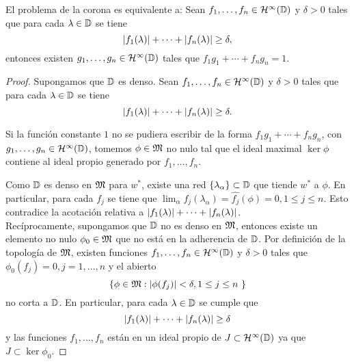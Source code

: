 \begin{theorem}
    El problema de la corona es equivalente a:
     Sean $f_1, \dots, f_n \in \mathcal{H}^{\infty}(\mathbb{D})$ y $\delta > 0$ tales que para cada $\lambda \in \mathbb{D}$ se tiene
\begin{equation*}
    \left\lvert f_1(\lambda)\right\rvert + \cdots + \left\lvert f_n(\lambda)\right\rvert \geq \delta,
\end{equation*}
     entonces existen $g_1, \dots, g_n \in \mathcal{H}^{\infty}(\mathbb{D})$ tales que $f_1 g_1 + \cdots + f_n g_n = 1$.

\end{theorem}

\begin{proof}
Supongamos que $\mathbb{D}$ es denso. Sean $f_1, \dots, f_n \in \mathcal{H}^{\infty}(\mathbb{D})$ y $\delta > 0$ tales que para cada $\lambda \in \mathbb{D}$ se tiene
\begin{equation*}
    \left\lvert f_1(\lambda)\right\rvert + \cdots + \left\lvert f_n(\lambda)\right\rvert \geq \delta.
\end{equation*}

Si la función constante $1$ no se pudiera escribir de la forma $f_1 g_1 + \cdots + f_n g_n$, con $g_1, \dots, g_n \in \mathcal{H}^{\infty}(\mathbb{D})$, tomemos $\phi \in \mathfrak{M}$ no nulo tal que el ideal maximal $\ker \phi$ contiene al ideal propio generado por $f_1, \dots, f_n$.

Como $\mathbb{D}$ es denso en $\mathfrak{M}$ para $w^*$, existe una red $\{ \lambda_\alpha \} \subset \mathbb{D}$ que tiende $w^*$ a $\phi$. En particular, para cada $f_j$ se tiene que $\lim_\alpha f_j (\lambda_\alpha) = \hat{f_j} (\phi) = 0, 1 \leq j \leq n$. Esto contradice la acotación relativa a $\left\lvert f_1(\lambda)\right\rvert + \cdots + \left\lvert f_n(\lambda)\right\rvert$. \\

Recíprocamente, supongamos que $\mathbb{D}$ no es denso en $\mathfrak{M}$, entonces existe un elemento no nulo $\phi_0 \in \mathfrak{M}$ que no está en la adherencia de $\mathbb{D}$. Por definición de la topología de $\mathfrak{M}$, existen funciones $f_1, \dots, f_n \in \mathcal{H}^{\infty}(\mathbb{D})$ y $\delta > 0$ tales que $\phi_0 (f_j) = 0, j = 1, \dots, n$ y el abierto
\begin{equation*}
    \{ \phi \in \fiber : \abs{\phi (f_j)} < \delta, 1 \leq j \leq n \}
\end{equation*}
no corta a $\mathbb{D}$. En particular, para cada $\lambda \in \mathbb{D}$ se cumple que
\begin{equation*}
    \left\lvert f_1(\lambda)\right\rvert + \cdots + \left\lvert f_n(\lambda)\right\rvert \geq \delta
\end{equation*}
y las funciones $f_1, \dots, f_n$ están en un ideal propio de $J \subset \mathcal{H}^{\infty}(\mathbb{D})$ ya que $J \subset \ker \phi_0$. %


\end{proof}
